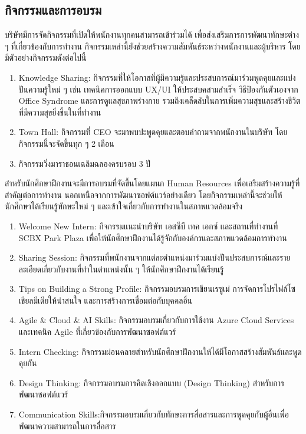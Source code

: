 \subsection{กิจกรรมและการอบรม}
บริษัทมีการจัดกิจกรรมที่เปิดให้พนักงานทุกคนสามารถเข้าร่วมได้ เพื่อส่งเสริมการการพัฒนาทักษะต่าง ๆ ที่เกี่ยวข้องกับการทำงาน กิจกรรมเหล่านี้ยังช่วยสร้างความสัมพันธ์ระหว่างพนักงานและผู้บริหาร โดยมีตัวอย่างกิจกรรมดังต่อไปนี้
\begin{enumerate}
    \item Knowledge Sharing: กิจกรรมที่ให้โอกาสที่ผู้มีความรู้และประสบการณ์มาร่วมพูดคุยและแบ่งปันความรู้ใหม่ ๆ เช่น เทคนิคการออกแบบ UX/UI ให้ประสบคสามสำเร็จ วิธีป้องกันตัวเองจาก Office Syndrome และการดูแลสุขภาพร่างกาย รวมถึงเคล็ดลับในการเพิ่มความสุขและสร้างชีวิตที่มีความสุขยิ่งขึ้นในที่ทำงาน
    \item Town Hall: กิจกรรมที่ CEO จะมาพบปะพูดคุยและตอบคำถามจากพนักงานในบริษัท โดยกิจกรรมนี้จะจัดขึ้นทุก ๆ 2 เดือน
    \item กิจกรรมวิ่งมาราธอนเฉลิมฉลองครบรอบ 3 ปี
\end{enumerate}
สำหรับนักศึกษาฝึกงานจะมีการอบรมที่จัดขึ้นโดยแผนก Human Resources เพื่อเสริมสร้างความรู้ที่สำคัญต่อการทำงาน นอกเหนือจากการพัฒนาซอฟต์แวร์อย่างเดียว โดยกิจกรรมเหล่านี้จะช่วยให้นักศึกษาได้เรียนรู้ทักษะใหม่ ๆ และเข้าใจเกี่ยวกับการทำงานในสภาพแวดล้อมจริง
\begin{enumerate}
    \item Welcome New Intern: กิจกรรมแนะนำบริษัท เอสซีบี เทค เอกซ์ และสถานที่ทำงานที่ SCBX Park Plaza เพื่อให้นักศึกษาฝึกงานได้รู้จักกับองค์กรและสภาพแวดล้อมการทำงาน

    \item Sharing Session: กิจกรรมที่พนักงานจากแต่ละตำแหน่งมาร่วมแบ่งปันประสบการณ์และรายละเอียดเกี่ยวกับงานที่ทำในตำแหน่งนั้น ๆ ให้นักศึกษาฝึกงานได้เรียนรู้
    
    \item Tips on Building a Strong Profile: กิจกรรมอบรมการเขียนเรซูเม่ การจัดการโปรไฟล์โซเชียลมีเดียให้น่าสนใจ และการสร้างการเชื่อมต่อกับบุคคลอื่น
    
    \item Agile \& Cloud \& AI Skills: กิจกรรมอบรมเกี่ยวกับการใช้งาน Azure Cloud Services และเทคนิค Agile ที่เกี่ยวข้องกับการพัฒนาซอฟต์แวร์
    
    \item Intern Checking: กิจกรรมผ่อนคลายสำหรับนักศึกษาฝึกงานให้ได้มีโอกาสสร้างสัมพันธ์และพูดคุยกัน
    
    \item Design Thinking: กิจกรรมอบรมการคิดเชิงออกแบบ (Design Thinking) สำหรับการพัฒนาซอฟต์แวร์
    
    \item Communication Skills:กิจกรรมอบรมเกี่ยวกับทักษะการสื่อสารและการพูดคุยกับผู้อื่นเพื่อพัฒนาความสามารถในการสื่อสาร
    
\end{enumerate}

